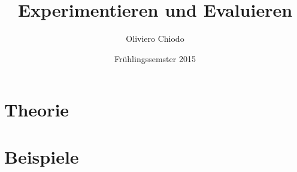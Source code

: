 \documentclass[a4paper]{article}
\title{Experimentieren und Evaluieren}
\author{Oliviero Chiodo}
\affil{Hochschule für Technik Rapperswil}
\date{Frühlingssemster 2015}
\begin{document}
\maketitle
\tableofcontents
\newpage
\section{Theorie}

\newpage
\section{Beispiele}

\end{document}
